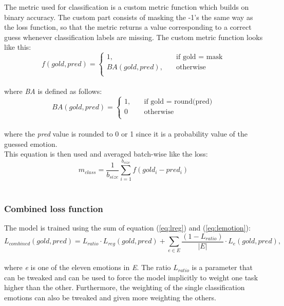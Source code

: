 The metric used for classification is a custom metric function which builds on binary accuracy. The custom part consists of masking the -1's the same way as the loss function, so that the metric returns a value corresponding to a correct guess whenever classification labels are missing. The custom metric function looks like this: \\
\begin{equation}
f(gold,pred) =
     \begin{cases}
       1, &\quad\text{if gold = mask}\\
       BA(gold,pred), &\quad\text{otherwise} \\
     \end{cases}
\end{equation}\\
where \textit{BA} is defined as follows: \\
\begin{equation} \label{eq:bin_acc}
BA(gold, pred) =
	\begin{cases}
		1, &\quad\text{if gold = round(pred)} \\
		0 &\quad\text{otherwise} \\
	\end{cases}
\end{equation}\\
where the \textit{pred} value is rounded to 0 or 1 since it is a probability value of the guessed emotion.\\
This equation is then used and averaged batch-wise like the loss: \\
\begin{equation} \label{eq:class_metric}
m_{class}=\dfrac{1}{b_{size}}\sum^{b_{size}}_{i=1}f\left(gold_{i}-pred_{i}\right)
\end{equation}\\

\subsubsection{Combined loss function}
The model is trained using the sum of equation (\ref{eq:lreg}) and (\ref{eq:lemotion}):\\
\begin{equation}
L_{combined}(gold,pred)=L_{ratio}\cdot L_{reg}(gold, pred) +  \sum_{e\in E}\dfrac{(1-L_{ratio})}{|E|}\cdot L_{e}(gold, pred),
\end{equation}\\
where \textit{e} is one of the eleven emotions in \textit{E}. The ratio $L_{ratio}$ is a parameter that can be tweaked and can be used to force the model implicitly to weight one task higher than the other. Furthermore, the weighting of the single classification emotions can also be tweaked and given more weighting the others.

